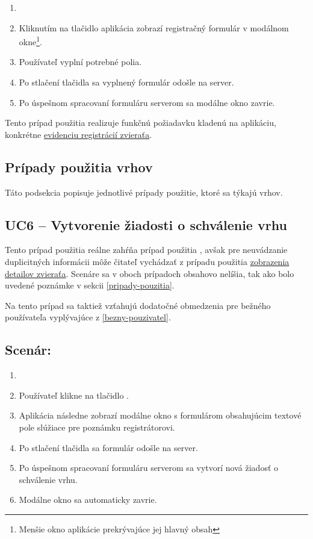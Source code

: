 \begin{enumerate}
	\item {}
	\item Kliknutím na tlačidlo  aplikácia zobrazí registračný formulár v modálnom okne\footnote{Menšie okno aplikácie prekrývajúce jej hlavný obsah}.
	\item Používateľ vyplní potrebné polia.
	\item Po stlačení tlačidla  sa vyplnený formulár odošle na server.
	\item Po úspešnom spracovaní formuláru serverom sa modálne okno zavrie.
\end{enumerate}

Tento prípad použitia realizuje funkčnú požiadavku kladenú na aplikáciu, konkrétne \hyperref[evidencia-registracii-zvierata]{evidenciu registrácií zvieraťa}.

\subsection{Prípady použitia vrhov}
Táto podsekcia popisuje jednotlivé prípady použitie, ktoré sa týkajú vrhov.

\subsection*{UC6 -- Vytvorenie žiadosti o schválenie vrhu}

Tento prípad použitia reálne zahŕňa prípad použitia , avšak pre neuvádzanie duplicitných informácii môže čitateľ vychádzať z prípadu použitia \hyperref[uc2]{zobrazenia detailov zvieraťa}. Scenáre sa v oboch prípadoch obsahovo nelíšia, tak ako bolo uvedené poznámke v sekcii \ref{pripady-pouzitia}.

Na tento prípad sa taktiež vzťahujú dodatočné obmedzenia pre bežného používateľa vyplývajúce z \ref{bezny-pouzivatel}.

\subsection*{Scenár:}

\begin{enumerate}
	\item {}
	\item Používateľ klikne na tlačidlo .
	\item Aplikácia následne zobrazí modálne okno s formulárom obsahujúcim textové pole slúžiace pre poznámku registrátorovi.
	\item Po stlačení tlačidla  sa formulár odošle na server.
	\item Po úspešnom spracovaní formuláru serverom sa vytvorí nová žiadosť o schválenie vrhu.
	\item Modálne okno sa automaticky zavrie.
\end{enumerate}

